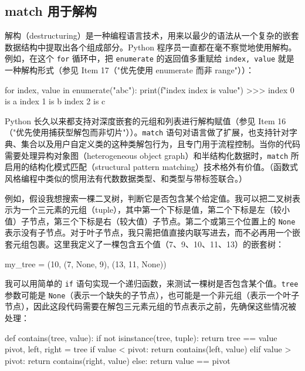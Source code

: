 \subsection{match 用于解构}

解构（destructuring）是一种编程语言技术，用来以最少的语法从一个复杂的嵌套数据结构中提取出各个组成部分。Python 程序员一直都在毫不察觉地使用解构。例如，在这个 \verb|for| 循环中，把 \verb|enumerate| 的返回值多重赋给 \verb|index, value| 就是一种解构形式（参见 Item 17（"优先使用 enumerate 而非 range"））：

\begin{codebox}[python]
for index, value in enumerate("abc"):
    print(f"index {index} is {value}")
>>>
index 0 is a
index 1 is b
index 2 is c
\end{codebox}

Python 长久以来都支持对深度嵌套的元组和列表进行解构赋值（参见 Item 16（"优先使用捕获型解包而非切片"））。\verb|match| 语句对语言做了扩展，也支持针对字典、集合以及用户自定义类的这种类解包行为，且专门用于流程控制。当你的代码需要处理异构对象图（heterogeneous object graph）和半结构化数据时，\verb|match| 所启用的结构化模式匹配（structural pattern matching）技术格外有价值。（函数式风格编程中类似的惯用法有代数数据类型、和类型与带标签联合。）

例如，假设我想搜索一棵二叉树，判断它是否包含某个给定值。我可以把二叉树表示为一个三元素的元组（tuple），其中第一个下标是值，第二个下标是左（较小值）子节点，第三个下标是右（较大值）子节点。第二个或第三个位置上的 \verb|None| 表示没有子节点。对于叶子节点，我只需把值直接内联写进去，而不必再用一个嵌套元组包裹。这里我定义了一棵包含五个值（7、9、10、11、13）的嵌套树：

\begin{codebox}[python]
my_tree = (10, (7, None, 9), (13, 11, None))
\end{codebox}

我可以用简单的 \verb|if| 语句实现一个递归函数，来测试一棵树是否包含某个值。\verb|tree| 参数可能是 \verb|None|（表示一个缺失的子节点），也可能是一个非元组（表示一个叶子节点），因此这段代码需要在解包三元素元组的节点表示之前，先确保这些情况被处理：

\begin{codebox}[python]
def contains(tree, value):
    if not isinstance(tree, tuple):
        return tree == value
    pivot, left, right = tree
    if value < pivot:
        return contains(left, value)
    elif value > pivot:
        return contains(right, value)
    else:
        return value == pivot
\end{codebox}

